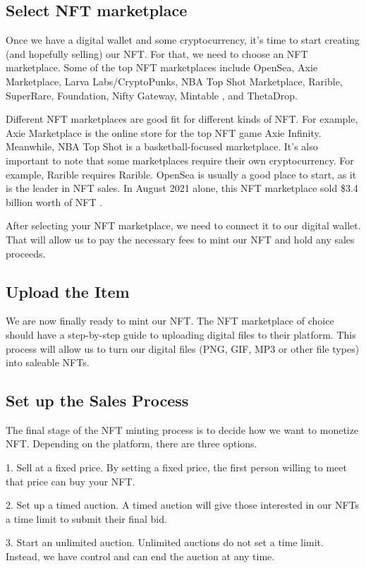 \subsection{Select NFT marketplace}
Once we have a digital wallet and some cryptocurrency, it's time to start creating (and hopefully selling) our NFT. For that, we need to choose an NFT marketplace. Some of the top NFT marketplaces include OpenSea, Axie Marketplace, Larva Labs/CryptoPunks, NBA Top Shot Marketplace, Rarible, SuperRare, Foundation, Nifty Gateway, Mintable , and ThetaDrop.

Different NFT marketplaces are good fit for different kinds of NFT. For example, Axie Marketplace is the online store for the top NFT game Axie Infinity. Meanwhile, NBA Top Shot is a basketball-focused marketplace. It's also important to note that some marketplaces require their own cryptocurrency. For example, Rarible requires Rarible.
OpenSea is usually a good place to start, as it is the leader in NFT sales. In August 2021 alone, this NFT marketplace sold \$3.4 billion worth of NFT \cite{how2makenfts}.

After selecting your NFT marketplace, we need to connect it to our digital wallet. That will allow us to pay the necessary fees to mint our NFT and hold any sales proceeds.

\subsection{Upload the Item}
We are now finally ready to mint our NFT. The NFT marketplace of choice should have a step-by-step guide to uploading digital files to their platform. This process will allow us to turn our digital files (PNG, GIF, MP3 or other file types) into saleable NFTs.

\subsection{Set up the Sales Process}
The final stage of the NFT minting process is to decide how we want to monetize NFT. Depending on the platform, there are three options.

1. Sell at a fixed price. By setting a fixed price, the first person willing to meet that price can buy your NFT.

2. Set up a timed auction. A timed auction will give those interested in our NFTs a time limit to submit their final bid.

3. Start an unlimited auction. Unlimited auctions do not set a time limit. Instead, we have control and can end the auction at any time.

